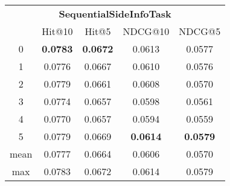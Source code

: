 \documentclass{article}
\begin{document}
 

\begin{tabular}{c|cccc}

\multicolumn{5}{c}{\textbf{SequentialSideInfoTask}} \\
\noalign{\smallskip}
\noalign{\smallskip}
\toprule
\multicolumn{1}{c}{Template ID} & \multicolumn{1}{|c}{Hit@10} & \multicolumn{1}{c}{Hit@5} & \multicolumn{1}{c}{NDCG@10} & \multicolumn{1}{c}{NDCG@5} \\
\midrule
0 & \textbf{0.0783} & \textbf{0.0672} & 0.0613 & 0.0577 \\
1 & 0.0776 & 0.0667 & 0.0610 & 0.0576 \\
2 & 0.0779 & 0.0661 & 0.0608 & 0.0570 \\
3 & 0.0774 & 0.0657 & 0.0598 & 0.0561 \\
4 & 0.0770 & 0.0657 & 0.0594 & 0.0559 \\
5 & 0.0779 & 0.0669 & \textbf{0.0614} & \textbf{0.0579} \\
\midrule
mean & 0.0777 & 0.0664 & 0.0606 & 0.0570 \\
max & 0.0783 & 0.0672 & 0.0614 & 0.0579 \\
\bottomrule

\end{tabular}
\end{document}
